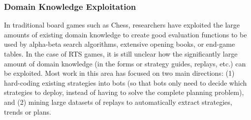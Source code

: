 \documentclass{llncs}
\begin{document}
\subsubsection*{Domain Knowledge Exploitation}
In traditional board  games such as Chess,  researchers have exploited
the  large  amounts  of  existing  domain  knowledge  to  create  good
evaluation  functions  to be  used  by  alpha-beta search  algorithms,
extensive opening books, or end-game tables. In the case of RTS games,
it  is still  unclear how  the  significantly large  amount of  domain
knowledge  (in the  forms or  strategy guides,  replays, etc.)  can be
exploited. Most  work in  this area has  focused on  two main
directions: (1) hard-coding existing strategies into bots (so that  bots only  need to
decide  which strategies  to deploy,  instead of  having to  solve the
complete  planning problem), and (2) mining large datasets
of  replays \cite{WeberCig09,synnaeve2012dataset} to automatically extract
 strategies,  trends   or  plans. %
\end{document}
